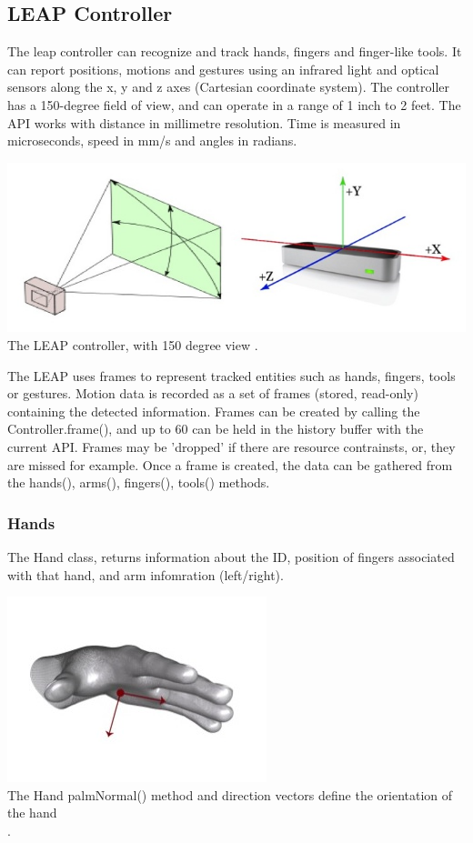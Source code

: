 \documentclass[10pt]{article}
\begin{document}
\subsection{LEAP Controller}
The leap controller can recognize and track hands, fingers and finger-like tools. It can report positions, motions and gestures using an infrared light and optical sensors along the x, y and z axes (Cartesian coordinate system). The controller has a 150-degree field of view, and can operate in a range of 1 inch to 2 feet. The API works with distance in millimetre resolution. Time is measured in microseconds, speed in mm/s and angles in radians.

\begin{center}
\includegraphics[scale=0.5]{leap}\\
The LEAP controller, with 150 degree view \cite{leap}.
\end{center}

The LEAP uses frames to represent tracked entities such as hands, fingers, tools or gestures. Motion data is recorded as a set of frames (stored, read-only) containing the detected information. 
Frames can be created by calling the Controller.frame(), and up to 60 can be held in the history buffer with the current API. Frames may be 'dropped' if there are resource contrainsts, or, they are missed for example. Once a frame is created, the data can be gathered from the hands(), arms(), fingers(), tools() methods.

\subsubsection{Hands}
The Hand class, returns information about the ID, position of fingers associated with that hand, and arm infomration (left/right).

\begin{center}
\includegraphics[scale=0.6]{palm}\\
The Hand palmNormal() method and direction vectors define the orientation of the hand \cite{leap}\\.
\end{center}
\end{document}
